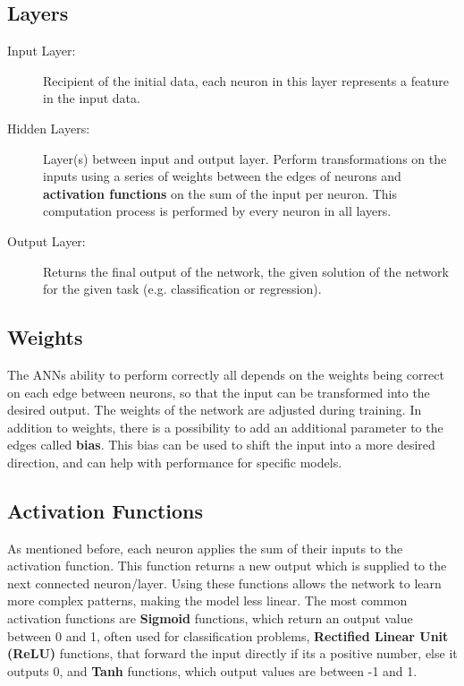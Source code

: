 \subsection{Layers}
\begin{description}
    \item[Input Layer:] Recipient of the initial data, each neuron in this layer represents a feature in the input data.
    \item[Hidden Layers:] Layer(s) between input and output layer. Perform transformations on the inputs using a series of weights between the edges of neurons and \textbf{activation functions} on the sum of the input per neuron. This computation process is performed by every neuron in all layers.
    \item[Output Layer:] Returns the final output of the network, the given solution of the network for the given task (e.g. classification or regression).\cite{Goodfellow-et-al-2016}
\end{description}

\subsection{Weights}
The ANNs ability to perform correctly all depends on the weights being correct on each edge between neurons, so that the input can be transformed into the desired output. The weights of the network are adjusted during training. In addition to weights, there is a possibility to add an additional parameter to the edges called \textbf{bias}. This bias can be used to shift the input into a more desired direction, and can help with performance for specific models. \cite{Goodfellow-et-al-2016}

\subsection{Activation Functions}
As mentioned before, each neuron applies the sum of their inputs to the activation function. This function returns a new output which is supplied to the next connected neuron/layer. Using these functions allows the network to learn more complex patterns, making the model less linear. The most common activation functions are \textbf{Sigmoid} functions, which return an output value between 0 and 1, often used for classification problems, \textbf{Rectified Linear Unit (ReLU) }functions, that forward the input directly if its a positive number, else it outputs 0, and \textbf{Tanh} functions, which output values are between -1 and 1.

